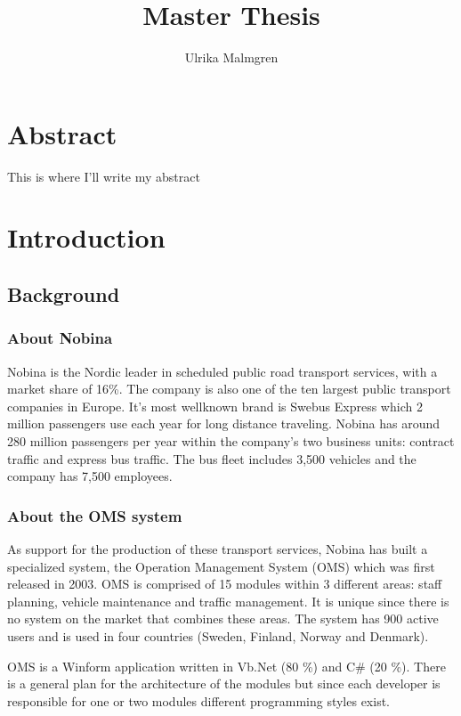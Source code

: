 \documentclass{article}
\title{Master Thesis}
\author{Ulrika Malmgren}
\begin{document}
	\maketitle
	\newpage


	\section*{Abstract}
	This is where I'll write my abstract
	\newpage 

	\tableofcontents
	\newpage


	\section{Introduction}
	\subsection{Background}
		\subsubsection{About Nobina}
		Nobina is the Nordic leader in scheduled public road transport services, with a market share of 16\%.
		The company is also one of the ten largest public transport companies in Europe. It's most wellknown brand is Swebus Express which 2 million passengers use each year for long distance
		traveling. Nobina has around 280 million passengers per year within the company’s two business units: contract traffic and express bus traffic. The bus fleet includes 3,500 vehicles and the company has 7,500 employees.

		\subsubsection{About the OMS system}
		As support for the production of these transport services, Nobina has built a specialized system, the Operation Management System (OMS) which was first released in 2003. OMS is comprised of 15 modules within 3 different areas: staff planning, vehicle maintenance and traffic management. It is unique since there is no system on the market that combines these areas. The system has 900 active users and is used in four countries (Sweden, Finland, Norway and Denmark).

		OMS is a Winform application written in Vb.Net (80 \%) and C\# (20 \%). There is a general plan for the architecture of the modules but since each developer is responsible for one or two modules different programming styles exist.
\end{document}

